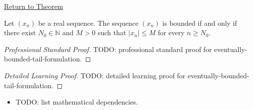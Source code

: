 \newpage
{}
\label{prf:eventually-bounded-tail-formulation}

\begin{remark*}[Return]
\hyperref[thm:eventually-bounded-tail-formulation]{Return to Theorem}
\end{remark*}

\begin{theorem*}
Let $(x_n)$ be a real sequence. The sequence $(x_n)$ is bounded if and only
if there exist $N_0 \in \mathbb{N}$ and $M > 0$ such that $|x_n| \le M$ for
every $n \ge N_0$.

\smallskip
\noindent
\end{theorem*}

\begin{proof}[Professional Standard Proof]
\LRAProofBodyStart
TODO: professional standard proof for eventually-bounded-tail-formulation.
\end{proof}

\begin{proof}[Detailed Learning Proof]
\LRAProofBodyStart
TODO: detailed learning proof for eventually-bounded-tail-formulation.
\end{proof}

\begin{remark*}
\end{remark*}

\begin{dependencies}
\begin{itemize}
  \item TODO: list mathematical dependencies.
\end{itemize}
\end{dependencies}

\clearpage

